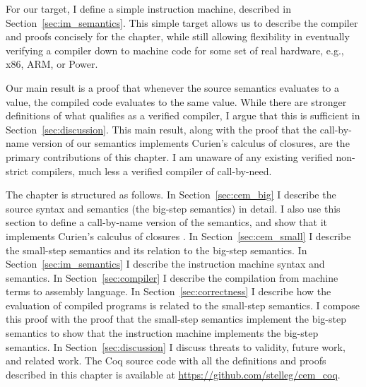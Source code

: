 For our target, I define a simple instruction machine, described in
Section~\ref{sec:im_semantics}. This simple target allows us to describe the
compiler and proofs concisely for the chapter, while still allowing
flexibility in eventually verifying a compiler down to machine code for some
set of real hardware, e.g., x86, ARM, or Power. 

Our main result is a proof that whenever the source semantics evaluates to a
value, the compiled code evaluates to the same value. While there are stronger
definitions of what qualifies as a verified compiler, I argue that this is
sufficient in Section~\ref{sec:discussion}. This main result, along with the
proof that the call-by-name version of our semantics implements Curien's
calculus of closures, are the primary contributions of this chapter. I am
unaware of any existing verified non-strict compilers, much less a verified
compiler of call-by-need. 

The chapter is structured as follows. In Section~\ref{sec:cem_big} I describe
the source syntax and semantics (the big-step \ce semantics) in detail.  I also
use this section to define a call-by-name version of the semantics, and show
that it implements Curien's calculus of closures \cite{curien1991abstract}.  In
Section~\ref{sec:cem_small} I describe the small-step \ce semantics and its
relation to the big-step semantics. In Section~\ref{sec:im_semantics} I describe
the instruction machine syntax and semantics. In Section~\ref{sec:compiler} I
describe the compilation from machine terms to assembly language. In
Section~\ref{sec:correctness} I describe how the evaluation of compiled programs
is related to the small-step \ce semantics. I compose this proof with the proof
that the small-step semantics implement the big-step semantics to show that the
instruction machine implements the big-step semantics. In
Section~\ref{sec:discussion} I discuss threats to validity, future work, and
related work. The Coq source code with all the definitions and proofs described
in this chapter is available at \url{https://github.com/stelleg/cem\_coq}. 
